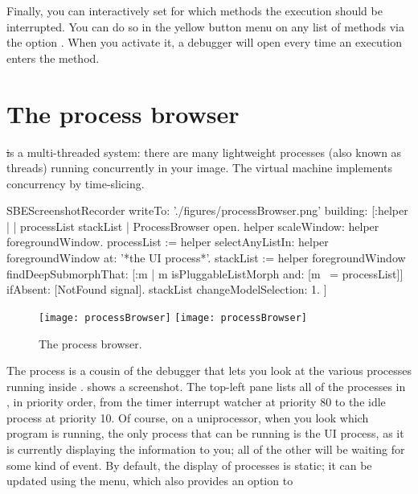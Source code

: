 \documentclass[a4paper,10pt,twoside]{book}
\begin{document}
Finally, you can interactively set for which methods the execution should be interrupted.
You can do so in the yellow button menu on any list of methods via the option .
When you activate it, a debugger will open every time an execution enters the method.


\section{The process browser}
\label{process-browser}

\st is a multi-threaded system: there are many lightweight processes (also known as threads) running concurrently in your image.
The \sq virtual machine implements concurrency by time-slicing.

\begin{ExecuteSmalltalkScript}
SBEScreenshotRecorder writeTo: './figures/processBrowser.png' building: [:helper |
	| processList stackList |
	ProcessBrowser open.
	helper scaleWindow: helper foregroundWindow.
	processList := helper selectAnyListIn: helper foregroundWindow at: '*the UI process*'.
	stackList := helper foregroundWindow findDeepSubmorphThat: [:m | m isPluggableListMorph and: [m ~= processList]] ifAbsent: [NotFound signal].
	stackList changeModelSelection: 1.
]
\end{ExecuteSmalltalkScript}
\begin{figure}[btp]
	\begin{center}
	\ifluluelse
		{\texttt{[image: processBrowser]}}
		{\texttt{[image: processBrowser]}}
	\end{center}
	\caption{The process browser.}
	\label{fig:processBrowser}
\end{figure}

The process  is a cousin of the debugger that lets you look at the various processes running inside \sq.
 shows a screenshot.
The top-left pane lists all of the processes in \sq, in priority order, from the timer interrupt watcher at priority 80 to the idle process at priority 10.
Of course, on a uniprocessor, when you look which program is running, the only process that can be running is the UI process, as it is currently displaying the information to you; all of the other will be waiting for some kind of event.
By default, the display of processes is static; it can be updated using the  menu, which also provides an option to 
\end{document}
